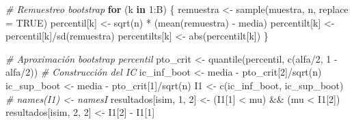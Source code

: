 \documentclass[
]{book}
\newenvironment{Shaded}{\begin{snugshade}}{\end{snugshade}}
\newcommand{\AttributeTok}[1]{\textcolor[rgb]{0.77,0.63,0.00}{#1}}
\newcommand{\CommentTok}[1]{\textcolor[rgb]{0.56,0.35,0.01}{\textit{#1}}}
\newcommand{\ConstantTok}[1]{\textcolor[rgb]{0.00,0.00,0.00}{#1}}
\newcommand{\ControlFlowTok}[1]{\textcolor[rgb]{0.13,0.29,0.53}{\textbf{#1}}}
\newcommand{\DecValTok}[1]{\textcolor[rgb]{0.00,0.00,0.81}{#1}}
\newcommand{\FunctionTok}[1]{\textcolor[rgb]{0.00,0.00,0.00}{#1}}
\newcommand{\NormalTok}[1]{#1}
\newcommand{\OtherTok}[1]{\textcolor[rgb]{0.56,0.35,0.01}{#1}}
\newcommand{\SpecialCharTok}[1]{\textcolor[rgb]{0.00,0.00,0.00}{#1}}
\theoremstyle{break}
\theoremstyle{definition}
\theoremstyle{definition}
\theoremstyle{definition}
\theoremstyle{definition}
\theoremstyle{remark}
\begin{document}
\begin{Shaded}
\begin{Highlighting}[]
    \CommentTok{\# Remuestreo bootstrap}
    \ControlFlowTok{for}\NormalTok{ (k }\ControlFlowTok{in} \DecValTok{1}\SpecialCharTok{:}\NormalTok{B) \{}
\NormalTok{        remuestra }\OtherTok{\textless{}{-}} \FunctionTok{sample}\NormalTok{(muestra, n, }\AttributeTok{replace =} \ConstantTok{TRUE}\NormalTok{)}
\NormalTok{        percentil[k] }\OtherTok{\textless{}{-}} \FunctionTok{sqrt}\NormalTok{(n) }\SpecialCharTok{*}\NormalTok{ (}\FunctionTok{mean}\NormalTok{(remuestra) }\SpecialCharTok{{-}}\NormalTok{ media)}
\NormalTok{        percentilt[k] }\OtherTok{\textless{}{-}}\NormalTok{ percentil[k]}\SpecialCharTok{/}\FunctionTok{sd}\NormalTok{(remuestra)}
\NormalTok{        percentilts[k] }\OtherTok{\textless{}{-}} \FunctionTok{abs}\NormalTok{(percentilt[k])}
\NormalTok{    \}}
    
    \CommentTok{\# Aproximación bootstrap percentil}
\NormalTok{    pto\_crit }\OtherTok{\textless{}{-}} \FunctionTok{quantile}\NormalTok{(percentil, }\FunctionTok{c}\NormalTok{(alfa}\SpecialCharTok{/}\DecValTok{2}\NormalTok{, }\DecValTok{1} \SpecialCharTok{{-}}\NormalTok{ alfa}\SpecialCharTok{/}\DecValTok{2}\NormalTok{))}
    \CommentTok{\# Construcción del IC}
\NormalTok{    ic\_inf\_boot }\OtherTok{\textless{}{-}}\NormalTok{ media }\SpecialCharTok{{-}}\NormalTok{ pto\_crit[}\DecValTok{2}\NormalTok{]}\SpecialCharTok{/}\FunctionTok{sqrt}\NormalTok{(n)}
\NormalTok{    ic\_sup\_boot }\OtherTok{\textless{}{-}}\NormalTok{ media }\SpecialCharTok{{-}}\NormalTok{ pto\_crit[}\DecValTok{1}\NormalTok{]}\SpecialCharTok{/}\FunctionTok{sqrt}\NormalTok{(n)}
\NormalTok{    I1 }\OtherTok{\textless{}{-}} \FunctionTok{c}\NormalTok{(ic\_inf\_boot, ic\_sup\_boot)}
    \CommentTok{\# names(I1) \textless{}{-} namesI}
\NormalTok{    resultados[isim, }\DecValTok{1}\NormalTok{, }\DecValTok{2}\NormalTok{] }\OtherTok{\textless{}{-}}\NormalTok{ (I1[}\DecValTok{1}\NormalTok{] }\SpecialCharTok{\textless{}}\NormalTok{ mu) }\SpecialCharTok{\&\&}\NormalTok{ (mu }\SpecialCharTok{\textless{}}\NormalTok{ I1[}\DecValTok{2}\NormalTok{])}
\NormalTok{    resultados[isim, }\DecValTok{2}\NormalTok{, }\DecValTok{2}\NormalTok{] }\OtherTok{\textless{}{-}}\NormalTok{ I1[}\DecValTok{2}\NormalTok{] }\SpecialCharTok{{-}}\NormalTok{ I1[}\DecValTok{1}\NormalTok{]}
    

\end{Highlighting}
\end{Shaded}
\end{document}
